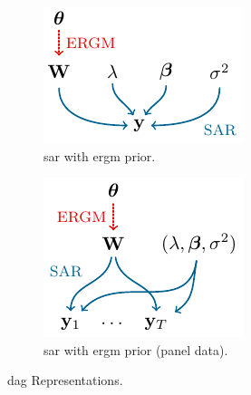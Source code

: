 \begin{figure}[t]
	\centering
	\begin{subfigure}{0.45\textwidth}
		\centering
		\includegraphics[scale=1]{figures-tikz/ergm.pdf}
		\caption{\acrshort{sar} with \acrshort{ergm} prior.}
		\label{fig:sar-ergm}
	\end{subfigure}
	\begin{subfigure}{0.45\textwidth}
		\centering
		\includegraphics[scale=1]{figures-tikz/ergm-panel.pdf}
		\caption{\acrshort{sar} with \acrshort{ergm} prior (panel data).}
		\label{fig:sar-ergm-panel}
	\end{subfigure}
	\caption{\acrshort{dag} Representations.}
	\label{fig:dag-representation}
\end{figure}
